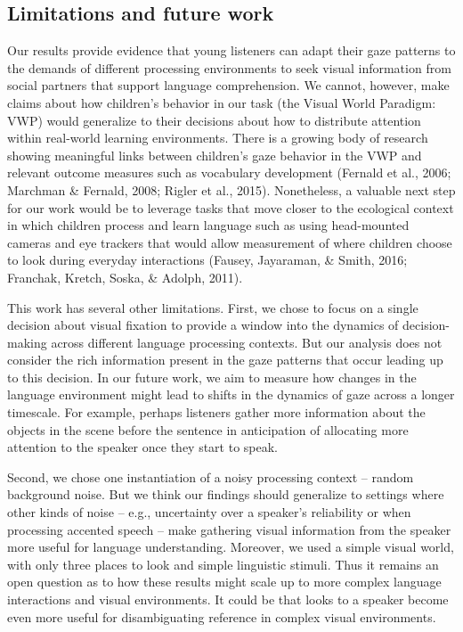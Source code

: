 \documentclass[,man,floatsintext]{apa6}
\begin{document}
\hypertarget{limitations-and-future-work}{%
\subsection{Limitations and future work}\label{limitations-and-future-work}}

Our results provide evidence that young listeners can adapt their gaze patterns to the demands of different processing environments to seek visual information from social partners that support language comprehension. We cannot, however, make claims about how children's behavior in our task (the Visual World Paradigm: VWP) would generalize to their decisions about how to distribute attention within real-world learning environments. There is a growing body of research showing meaningful links between children's gaze behavior in the VWP and relevant outcome measures such as vocabulary development (Fernald et al., 2006; Marchman \& Fernald, 2008; Rigler et al., 2015). Nonetheless, a valuable next step for our work would be to leverage tasks that move closer to the ecological context in which children process and learn language such as using head-mounted cameras and eye trackers that would allow measurement of where children choose to look during everyday interactions (Fausey, Jayaraman, \& Smith, 2016; Franchak, Kretch, Soska, \& Adolph, 2011).

This work has several other limitations. First, we chose to focus on a single decision about visual fixation to provide a window into the dynamics of decision-making across different language processing contexts. But our analysis does not consider the rich information present in the gaze patterns that occur leading up to this decision. In our future work, we aim to measure how changes in the language environment might lead to shifts in the dynamics of gaze across a longer timescale. For example, perhaps listeners gather more information about the objects in the scene before the sentence in anticipation of allocating more attention to the speaker once they start to speak.

Second, we chose one instantiation of a noisy processing context -- random background noise. But we think our findings should generalize to settings where other kinds of noise -- e.g., uncertainty over a speaker's reliability or when processing accented speech -- make gathering visual information from the speaker more useful for language understanding. Moreover, we used a simple visual world, with only three places to look and simple linguistic stimuli. Thus it remains an open question as to how these results might scale up to more complex language interactions and visual environments. It could be that looks to a speaker become even more useful for disambiguating reference in complex visual environments.
\end{document}
